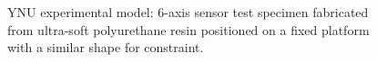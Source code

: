  \begin{figure}%
    \centering
   \qquad
   \caption[Experimental model II]{YNU experimental model: 6-axis sensor test specimen fabricated from ultra-soft polyurethane resin positioned on a fixed platform with a similar shape for constraint.}%
   \label{fig:secondexperiment}%
\end{figure}

